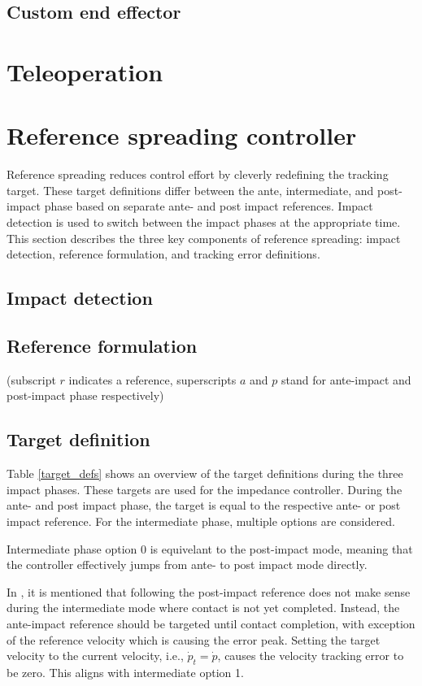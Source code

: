 \documentclass[a4paper, 10pt, conference]{ieeeconf}
\begin{document}
    \subsection{Custom end effector}
    
    \section{Teleoperation}

    \section{Reference spreading controller}
    Reference spreading reduces control effort by cleverly redefining the tracking target. These target definitions differ between the ante, intermediate, and post-impact phase based on separate ante- and post impact references. Impact detection is used to switch between the impact phases at the appropriate time. This section describes the three key components of reference spreading: impact detection, reference formulation, and tracking error definitions.

    \subsection{Impact detection}

    \subsection{Reference formulation}
    (subscript $r$ indicates a reference, superscripts $a$ and $p$ stand for ante-impact and post-impact phase respectively)
    \subsection{Target definition}
    Table \ref{target_defs} shows an overview of the target definitions during the three impact phases. These targets are used for the impedance controller. During the ante- and post impact phase, the target is equal to the respective ante- or post impact reference. For the intermediate phase, multiple options are considered.

    Intermediate phase option 0 is equivelant to the post-impact mode, meaning that the controller effectively jumps from ante- to post impact mode directly.

    In \cite{vansteenRobotControlSimultaneous2021}, it is mentioned that following the post-impact reference does not make sense during the intermediate mode where contact is not yet completed. Instead, the ante-impact reference should be targeted until contact completion, with exception of the reference velocity which is causing the error peak. Setting the target velocity to the current velocity, i.e., $\dot{p}_t=\dot{p}$, causes the velocity tracking error to be zero. This aligns with intermediate option 1.
\end{document}
